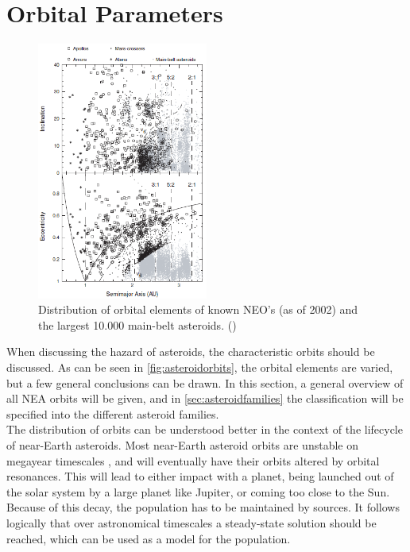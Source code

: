 \section{Orbital Parameters}
\label{sec:orbitalparameters}

\begin{figure}[htb]
    \centering
    \includegraphics[width=0.5\textwidth]{images/asteroidorbits.png}
    \caption{Distribution of orbital elements of known NEO's (as of 2002) and the largest 10.000 main-belt asteroids. (\cite{originandevolution})}
    \label{fig:asteroidorbits}
\end{figure}

When discussing the hazard of asteroids, the characteristic orbits should be discussed. As can be seen in \autoref{fig:asteroidorbits}, the orbital elements are varied, but a few general conclusions can be drawn. In this section, a general overview of all NEA orbits will be given, and in \autoref{sec:asteroidfamilies} the classification will be specified into the different asteroid families. \\

The distribution of orbits can be understood better in the context of the lifecycle of near-Earth asteroids. Most near-Earth asteroid orbits are unstable on megayear timescales \cite{neonieuw}, and will eventually have their orbits altered by orbital resonances. This will lead to either impact with a planet, being launched out of the solar system by a large planet like Jupiter, or coming too close to the Sun. Because of this decay, the population has to be maintained by sources. It follows logically that over astronomical timescales a steady-state solution should be reached, which can be used as a model for the population.\\

